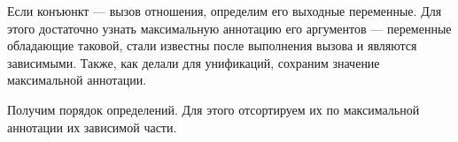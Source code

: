 Если конъюнкт --- вызов отношения, определим его выходные переменные.
Для этого достаточно узнать максимальную аннотацию его аргументов --- переменные обладающие таковой, стали известны после выполнения вызова и являются зависимыми.
Также, как делали для унификаций, сохраним значение максимальной аннотации.

Получим порядок определений.
Для этого отсортируем их по максимальной аннотации их зависимой части.
